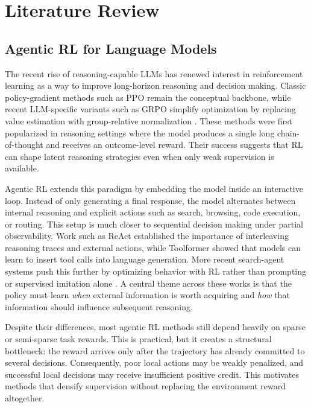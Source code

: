 \documentclass[11pt]{article}
\newcommand{\grpo}{GRPO}
\newcommand{\ppo}{PPO}
\begin{document}
\section{Literature Review}
\subsection{Agentic RL for Language Models}
The recent rise of reasoning-capable LLMs has renewed interest in reinforcement learning as a way to improve long-horizon reasoning and decision making. Classic policy-gradient methods such as \ppo{} \citep{schulman2017ppo} remain the conceptual backbone, while recent LLM-specific variants such as \grpo{} simplify optimization by replacing value estimation with group-relative normalization \citep{deepseekr1}. These methods were first popularized in reasoning settings where the model produces a single long chain-of-thought and receives an outcome-level reward. Their success suggests that RL can shape latent reasoning strategies even when only weak supervision is available.

Agentic RL extends this paradigm by embedding the model inside an interactive loop. Instead of only generating a final response, the model alternates between internal reasoning and explicit actions such as search, browsing, code execution, or routing. This setup is much closer to sequential decision making under partial observability. Work such as ReAct \citep{yao2023react} established the importance of interleaving reasoning traces and external actions, while Toolformer \citep{schick2023toolformer} showed that models can learn to insert tool calls into language generation. More recent search-agent systems push this further by optimizing behavior with RL rather than prompting or supervised imitation alone \citep{jin2025search,jin2025empirical}. A central theme across these works is that the policy must learn \emph{when} external information is worth acquiring and \emph{how} that information should influence subsequent reasoning.

Despite their differences, most agentic RL methods still depend heavily on sparse or semi-sparse task rewards. This is practical, but it creates a structural bottleneck: the reward arrives only after the trajectory has already committed to several decisions. Consequently, poor local actions may be weakly penalized, and successful local decisions may receive insufficient positive credit. This motivates methods that densify supervision without replacing the environment reward altogether.
\end{document}
